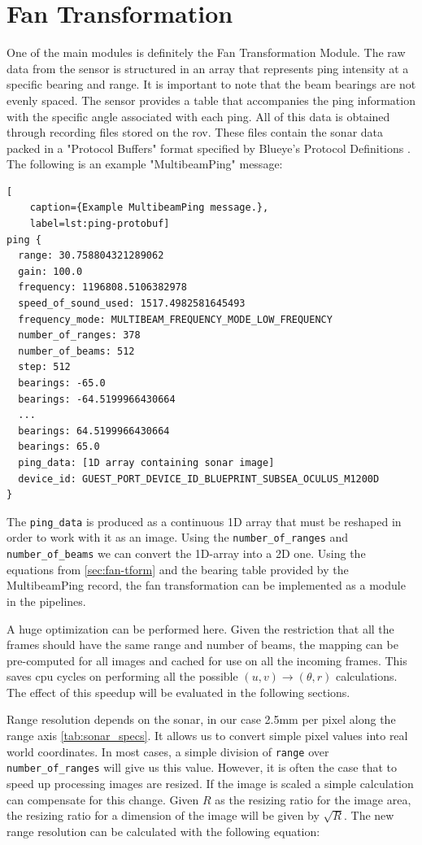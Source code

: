 \section{Fan Transformation}
One of the main modules is definitely the Fan Transformation Module. The raw data from the sensor is structured in an array that represents ping intensity at a specific bearing and range. It is important to note that the beam bearings are not evenly spaced. The sensor provides a table that accompanies the ping information with the specific angle associated with each ping. All of this data is obtained through recording files stored on the \acrshort{rov}. These files contain the sonar data packed in a "Protocol Buffers" format specified by Blueye's Protocol Definitions \cite{Blueye:ProtocolDefinitions}. The following is an example "MultibeamPing" message:

\begin{lstlisting}[
    caption={Example MultibeamPing message.},
    label=lst:ping-protobuf]
ping {
  range: 30.758804321289062
  gain: 100.0
  frequency: 1196808.5106382978
  speed_of_sound_used: 1517.4982581645493
  frequency_mode: MULTIBEAM_FREQUENCY_MODE_LOW_FREQUENCY
  number_of_ranges: 378
  number_of_beams: 512
  step: 512
  bearings: -65.0
  bearings: -64.5199966430664
  ...
  bearings: 64.5199966430664
  bearings: 65.0
  ping_data: [1D array containing sonar image]
  device_id: GUEST_PORT_DEVICE_ID_BLUEPRINT_SUBSEA_OCULUS_M1200D
}
\end{lstlisting}

The \lstinline{ping_data} is produced as a continuous 1D array that must be reshaped in order to work with it as an image. Using the \lstinline{number_of_ranges} and \lstinline{number_of_beams} we can convert the 1D-array into a 2D one. Using the equations from \ref{sec:fan-tform} and the bearing table provided by the MultibeamPing record, the fan transformation can be implemented as a module in the pipelines. 

A huge optimization can be performed here. Given the restriction that all the frames should have the same range and number of beams, the mapping can be pre-computed for all images and cached for use on all the incoming frames. This saves cpu cycles on performing all the possible \((u, v) \rightarrow (\theta,r)\) calculations. The effect of this speedup will be evaluated in the following sections.

Range resolution depends on the sonar, in our case 2.5mm per pixel along the range axis \ref{tab:sonar_specs}. It allows us to convert simple pixel values into real world coordinates. In most cases, a simple division of \lstinline{range} over \lstinline{number_of_ranges} will give us this value. However, it is often the case that to speed up processing images are resized. If the image is scaled a simple calculation can compensate for this change. Given \(R\) as the resizing ratio for the image area, the resizing ratio for a dimension of the image will be given by \(\sqrt{R}\). The new range resolution can be calculated with the following equation:

